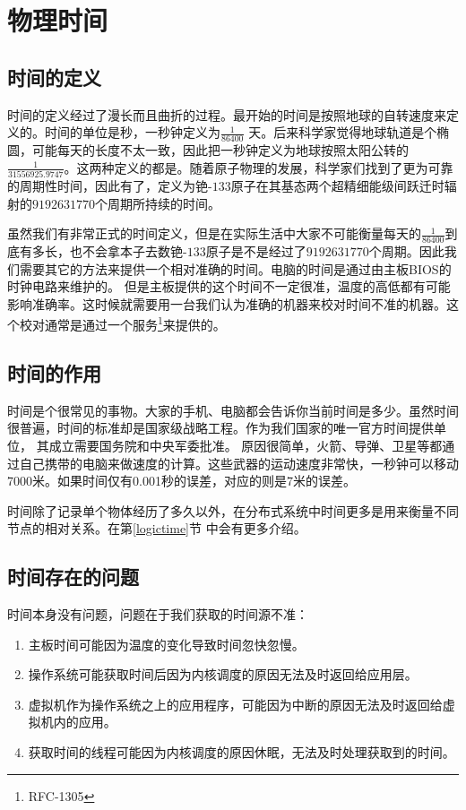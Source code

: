 \section{物理时间}

\subsection{时间的定义}

时间的定义经过了漫长而且曲折的过程。最开始的时间是按照地球的自转速度来定义的。时间的单位是秒，一秒钟定义为$\frac{1}{86400}$ 天。后来科学家觉得地球轨道是个椭圆，可能每天的长度不太一致，因此把一秒钟定义为地球按照太阳公转的$\frac{1}{31556925.9747}$。这两种定义的都是。随着原子物理的发展，科学家们找到了更为可靠的周期性时间，因此有了，定义为铯-$133$原子在其基态两个超精细能级间跃迁时辐射的$9192631770$个周期所持续的时间。



虽然我们有非常正式的时间定义，但是在实际生活中大家不可能衡量每天的$\frac{1}{86400}$到底有多长，也不会拿本子去数铯-$133$原子是不是经过了$9192631770$个周期。因此我们需要其它的方法来提供一个相对准确的时间。电脑的时间是通过由主板BIOS的时钟电路来维护的。 但是主板提供的这个时间不一定很准，温度的高低都有可能影响准确率。这时候就需要用一台我们认为准确的机器来校对时间不准的机器。这个校对通常是通过一个服务\footnote{RFC-1305}来提供的。

\subsection{时间的作用}

时间是个很常见的事物。大家的手机、电脑都会告诉你当前时间是多少。虽然时间很普遍，时间的标准却是国家级战略工程。作为我们国家的唯一官方时间提供单位， 其成立需要国务院和中央军委批准。 原因很简单，火箭、导弹、卫星等都通过自己携带的电脑来做速度的计算。这些武器的运动速度非常快，一秒钟可以移动7000米。如果时间仅有0.001秒的误差，对应的则是7米的误差。

时间除了记录单个物体经历了多久以外，在分布式系统中时间更多是用来衡量不同节点的相对关系。在第\ref{logictime}节  中会有更多介绍。

\subsection{时间存在的问题}

时间本身没有问题，问题在于我们获取的时间源不准：
\begin{enumerate}
    \item 主板时间可能因为温度的变化导致时间忽快忽慢。
    \item 操作系统可能获取时间后因为内核调度的原因无法及时返回给应用层。
    \item 虚拟机作为操作系统之上的应用程序，可能因为中断的原因无法及时返回给虚拟机内的应用。
    \item 获取时间的线程可能因为内核调度的原因休眠，无法及时处理获取到的时间。
\end{enumerate}

